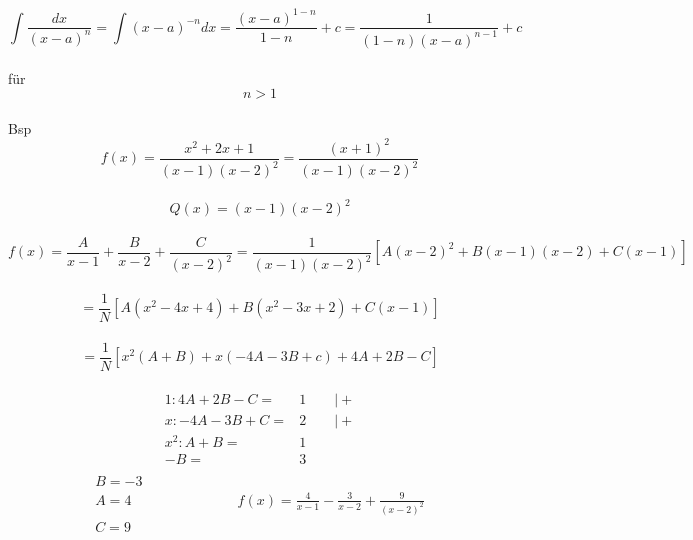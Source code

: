\documentclass[fleqn,a4paper]{scrartcl}
\begin{document}
\[
\int \frac{dx}{(x-a)^n} = \int (x-a)^{-n}dx = \frac{(x-a)^{1-n}}{1-n} +c = \frac{1}{(1-n)(x-a)^{n-1}} +c \] \\ für \[ n>1 \] \\ Bsp \[ 
f(x) = \frac{x^2 + 2x +1}{(x-1)(x-2)^2} = \frac{(x+1)^2}{(x-1)(x-2)^2} \] \\ \[
Q(x) = (x-1) (x-2)^2 \] \\ \[
f(x) = \frac{A}{x-1}+ \frac{B}{x-2}+\frac{C}{(x-2)^2} = \frac{1}{(x-1)(x-2)^2}[A(x-2)^2 + B(x-1)(x-2) +C(x-1)]\] \\ \[
=\frac{1}{N} [A(x^2-4x+4)+B(x^2-3x+2)+C(x-1)] \] \\ \[
=\frac{1}{N}[x^2(A+B) +x(-4A-3B+c)+4A+2B-C] \] \\ 
\begin{eqnarray*}
1: 4A+2B-C =& 1 \qquad \vert + \\
x: -4A-3B+C =& 2\qquad \vert + \\
x^2: A+B =& 1 \\
-B =& 3 \\
\end{eqnarray*}
\begin{eqnarray*}
B=-3& \\
A=4& \qquad \qquad \qquad f(x) = \frac{4}{x-1} -\frac{3}{x-2} + \frac{9}{(x-2)^2} \\
C=9&
\end{eqnarray*}
\end{document}
